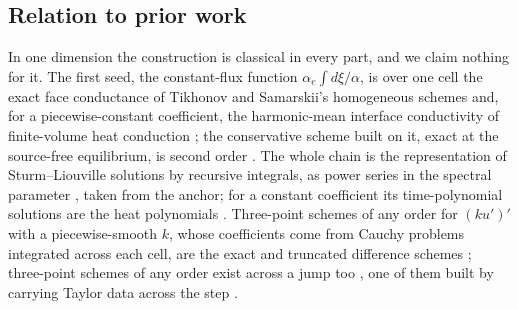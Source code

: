 \documentclass[11pt]{amsart}
\theoremstyle{definition}
\theoremstyle{remark}
\begin{document}
\subsection{Relation to prior work}
\label{sec:priorwork}
In one dimension the construction is classical in every part, and we claim
nothing for it. The first seed, the constant-flux function
$\alpha_e \int d\xi/\alpha$, is over one cell the exact face conductance of
Tikhonov and Samarskii's homogeneous schemes
\cite{TikhonovSamarskii1962,Samarskii2001} and, for a piecewise-constant
coefficient, the harmonic-mean interface conductivity of finite-volume heat
conduction \cite{Patankar1980}; the conservative scheme built on it, exact
at the source-free equilibrium, is second order \cite{PanXuLi2026}. The
whole chain is the representation of Sturm--Liouville solutions by recursive
integrals, as power series in the spectral parameter
\cite{Kravchenko2008,KravchenkoPorter2010}, taken from the anchor; for a
constant coefficient its time-polynomial solutions are the heat polynomials
\cite{RosenbloomWidder1959,Widder1975}. Three-point schemes of any order for
$(k u')'$ with a piecewise-smooth $k$, whose coefficients come from Cauchy
problems integrated across each cell, are the exact and truncated difference
schemes \cite{SamarskiiMakarov1990,GavrilyukEtAl2011}; three-point schemes
of any order exist across a jump too \cite{Gartland1989}, one of them built
by carrying Taylor data across the step \cite{Sujecki2010}.
\end{document}
